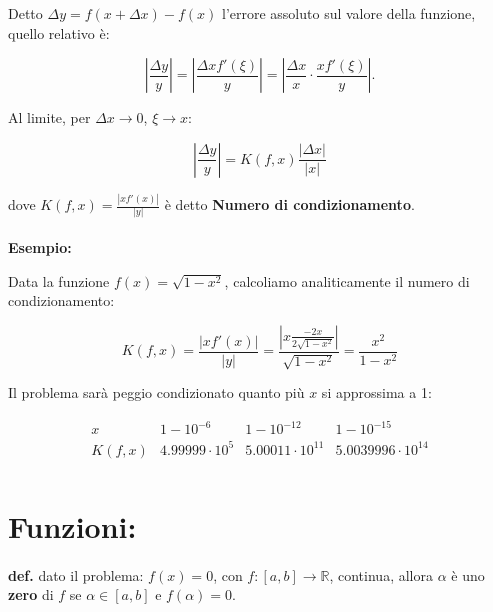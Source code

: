 \documentclass[a4paper, 11pt]{article}
\begin{document}
        Detto \( \Delta y = f(x + \Delta x) - f(x) \) l'errore assoluto sul valore della funzione, quello relativo è:

        \[
            \left| \frac{\Delta y}{y} \right| = \left| \frac{\Delta x f'(\xi)}{y} \right| = \left| \frac{\Delta x}{x} \cdot \frac{x f'(\xi)}{y} \right|.
        \]

        Al limite, per \( \Delta x \to 0 \), \( \xi \to x \):

        \[
            \left| \frac{\Delta y}{y} \right| = K(f, x) \frac{|\Delta x|}{|x|}
        \]

        dove  $K(f, x) = \frac{|x f'(x)|}{|y|}$ è detto \textbf{Numero di condizionamento}.

        \paragraph{}
        \textbf{Esempio:}

        Data la funzione \( f(x) = \sqrt{1 - x^2} \), calcoliamo analiticamente il numero di condizionamento:


        \[
            K(f, x) = \frac{|x f'(x)|}{|y|} = \frac{|x \frac{-2x}{2\sqrt{1 - x^2}}|}{\sqrt{1 - x^2}} = \frac{x^2}{1 - x^2}
        \]



        Il problema sarà peggio condizionato quanto più \( x \) si approssima a 1:

        \[
        \begin{array}{c|c|c|c|c}
            x & 1 - 10^{-6} & 1 - 10^{-12} & 1 - 10^{-15} \\ \hline
            K(f, x) & 4.99999 \cdot 10^5 & 5.00011 \cdot 10^{11} & 5.0039996 \cdot 10^{14} \\
        \end{array}
        \]

        

    \section{Funzioni:}
        
        \paragraph{}
        \textbf{def. } dato il problema: \( f(x) = 0 \), con \( f: [a, b] \to \mathbb{R} \), continua, allora \( \alpha \) è uno \textbf{zero} di \( f \) se \( \alpha \in [a, b] \) e \( f(\alpha) = 0 \). 
        
\end{document}
